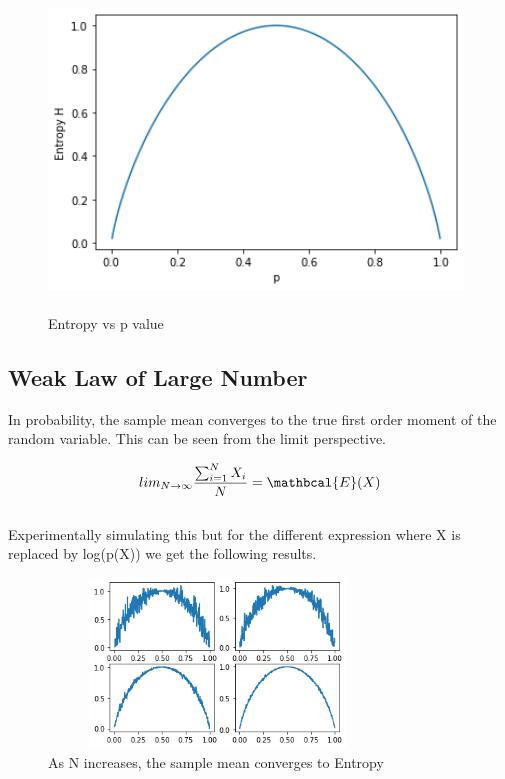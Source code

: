 \documentclass[11pt]{article}
\begin{document}
\begin{center}
        \begin{figure}[!h]
        \centering
          \includegraphics[width=110mm, height=85mm]{Entropy_vs_p.png}
          \caption{ Entropy vs p value
          }
          \label{fig:Piston}
        \end{figure}
\end{center}

\subsection{Weak Law of Large Number}
In probability, the sample mean converges to the true first order moment of the random variable. This can be seen from the limit perspective. 

\[ lim_{N\to\infty} \frac{\sum_{i=1}^{N}X_i}{N} = \mathbcal{E}(X)\]
\\
Experimentally simulating this but for the different expression where X is replaced by log(p(X)) we get the following results. 

\begin{center}
        \begin{figure}[h]
        \centering
          \includegraphics[width=90mm, height=45mm]{WLLN.png}
          \caption{ As N increases, the sample mean converges to Entropy
          }
          \label{fig:Piston}
        \end{figure}
\end{center}
\pagebreak
\end{document}
